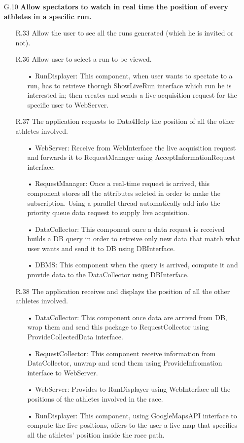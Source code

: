 \begin{enumerate}
\item [G.10] \textbf{Allow spectators to watch in real time the position of every athletes in a specific run.}
	\begin{enumerate}
	\item [R.33] Allow the user to see all the runs generated (which he is invited or not).
	\item [R.36] Allow user to select a run to be viewed.
		\begin{enumerate}
		\item[•] RunDisplayer: This component, when user wants to spectate to a run, has to retrieve thorugh ShowLiveRun interface which run he is interested in; then creates and sends a live acquisition request for the specific user to WebServer.
		\end{enumerate}	
	\item [R.37] The application requests to Data4Help the position of all the other athletes involved.
		\begin{enumerate}
		\item[•] WebServer: Receive from WebInterface the live acquisition request and forwards it to RequestManager using AcceptInformationRequest interface.
		\item[•] RequestManager: Once a real-time request is arrived, this component stores all the attributes selcted in order to make the subscription. Using a parallel thread automatically add into the priority queue data request to supply live acquisition.
		\item[•] DataCollector: This component once a data request is received builds a DB query in order to retreive only new data that match what user wants and send it to DB using DBInterface.
		\item[•] DBMS: This component when the query is arrived, compute it and provide data to the DataCollector using DBInterface.
		\end{enumerate}	
	\item [R.38] The application receives and displays the position of all the other athletes involved.
		\begin{enumerate}
		\item[•] DataCollector: This component once data are arrived from DB, wrap them and send this package to RequestCollector using ProvideCollectedData interface.
		\item[•] RequestCollector: This component receive information from DataCollector, unwrap and send them using ProvideInfromation interface to WebServer.
		\item[•] WebServer: Provides to RunDisplayer using WebInterface all the positions of the athletes involved in the race.
		\item[•] RunDisplayer: This component, using GoogleMapsAPI interface to compute the live positions, offers to the user a live map that specifies all the athletes' position inside the race path.
		\end{enumerate}	
	\end{enumerate}
	
\end{enumerate}